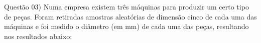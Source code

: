 
\noindent \textcolor{COLOR1}{Questão 03)} Numa empresa existem três máquinas para produzir um certo tipo de peças. Foram retiradas amostras aleatórias de dimensão cinco de cada uma das máquinas e foi medido o diâmetro (em mm) de cada uma das peças, resultando nos resultados abaixo:
\\
